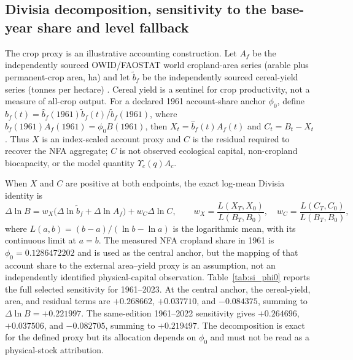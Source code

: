 \documentclass[11pt,a4paper]{article}
\newcommand{\Ups}{\Upsilon_c}
\begin{document}
\newpage
\subsection{Divisia decomposition, sensitivity to the base-year share and level fallback}\label{si:divisia}

The crop proxy is an illustrative accounting construction. Let $A_f$ be the independently sourced OWID/FAOSTAT world cropland-area series (arable plus permanent-crop area, ha) and let $\tilde b_f$ be the independently sourced cereal-yield series (tonnes per hectare) \citep{OWIDCereal2026,OWIDCropland2026}. Cereal yield is a sentinel for crop productivity, not a measure of all-crop output. For a declared 1961 account-share anchor $\phi_0$, define $\hat b_f(t)=\hat b_f(1961)\tilde b_f(t)/\tilde b_f(1961)$, where $\hat b_f(1961)A_f(1961)=\phi_0B(1961)$, then $X_t=\hat b_f(t)A_f(t)$ and $C_t=B_t-X_t$. Thus $X$ is an index-scaled account proxy and $C$ is the residual required to recover the NFA aggregate; $C$ is not observed ecological capital, non-cropland biocapacity, or the model quantity $\Ups(q)A_c$.

When $X$ and $C$ are positive at both endpoints, the exact log-mean Divisia identity is
\begin{equation}
\Delta\ln B=w_X\bigl(\Delta\ln\tilde b_f+\Delta\ln A_f\bigr)+w_C\Delta\ln C,
\qquad w_X=\frac{L(X_T,X_0)}{L(B_T,B_0)},\quad w_C=\frac{L(C_T,C_0)}{L(B_T,B_0)},
\end{equation}
where $L(a,b)=(b-a)/(\ln b-\ln a)$ is the logarithmic mean, with its continuous limit at $a=b$. The measured NFA cropland share in 1961 is $\phi_0=0.1286472202$ and is used as the central anchor, but the mapping of that account share to the external area--yield proxy is an assumption, not an independently identified physical-capital observation. Table~\ref{tab:si_phi0} reports the full selected sensitivity for 1961--2023. At the central anchor, the cereal-yield, area, and residual terms are $+0.268662$, $+0.037710$, and $-0.084375$, summing to $\Delta\ln B=+0.221997$. The same-edition 1961--2022 sensitivity gives $+0.264696$, $+0.037506$, and $-0.082705$, summing to $+0.219497$. The decomposition is exact for the defined proxy but its allocation depends on $\phi_0$ and must not be read as a physical-stock attribution.
\end{document}
